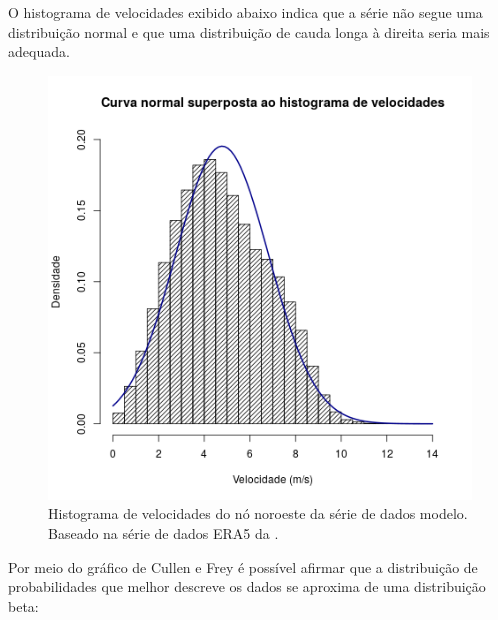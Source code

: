 \documentclass[
	12pt,				%
	openright,			%
	oneside,			%
	a4paper,			%
	english,			%
	french,				%
	spanish,			%
	brazil				%
	]{abntex2}
\begin{document}
O histograma de velocidades exibido abaixo indica que a série não segue uma distribuição normal e que uma distribuição de cauda longa à direita seria mais adequada. 

\begin{figure}[h]
    \centering
	\includegraphics[scale=0.7]{normal_overlay}
	\caption{Histograma de velocidades do nó noroeste da série de dados modelo. Baseado na série de dados ERA5 da \cite{era5}.}
\end{figure}
\FloatBarrier

Por meio do gráfico de Cullen e Frey \cite{frey} é possível afirmar que a distribuição de probabilidades que melhor descreve os dados se aproxima de uma distribuição beta:
\end{document}
